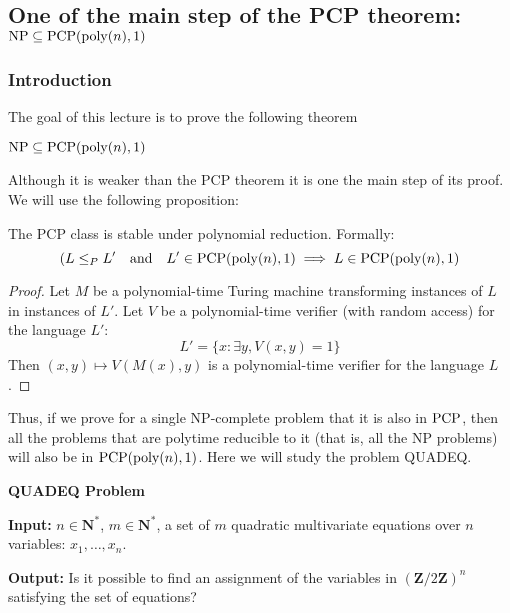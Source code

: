 


\subsection{One of the main step of the PCP theorem: $\mathrm{NP} \subseteq
\mathrm{PCP}(\mathrm{poly}(n),1)$}


\subsubsection{Introduction}
The goal of this lecture is to prove the following theorem
\begin{theorem}\label{theorem1}
$\mathrm{NP} \subseteq
\mathrm{PCP}(\mathrm{poly}(n),1)$
\end{theorem}

Although it is weaker than the PCP theorem it is one the main step of its proof.
We will use the following proposition:
\begin{prop}
The PCP class is stable under polynomial reduction. Formally:
\begin{displaymath}
(L\leq_P L' \quad\mathrm{and}\quad L'\in \mathrm{PCP}(\mathrm{poly}(n),1) \implies L\in
\mathrm{PCP}(\mathrm{poly}(n),1)
\end{displaymath}
\end{prop}

\begin{proof}
Let $M$ be a polynomial-time Turing machine transforming instances of $L$ in
instances of $L'$. Let $V$ be a polynomial-time verifier (with random access)
for the language $L'$:
\begin{displaymath}
L' = \{ x: \exists y, V(x,y) = 1 \}
\end{displaymath}
Then $(x,y)\mapsto V(M(x),y)$ is a polynomial-time verifier for the language
$L$. 
\end{proof}

Thus, if we prove for a single NP-complete problem that it is also in
$\mathrm{PCP}$, then all the problems that are polytime reducible to
it (that is, all the NP problems) will also be in $\mathrm{PCP}(\mathrm{poly}(n),1)$.
Here we will study the problem \textsf{QUADEQ}.

\begin{encadre}{\textwidth}
\begin{center}
\textbf{\textsf{QUADEQ} Problem}
\end{center}

\textbf{Input:} $n\in\mathbf{N}^*$, $m\in\mathbf{N}^*$, a set of $m$ quadratic
multivariate equations over $n$ variables: $x_1,\ldots,x_n$.

\textbf{Output:} Is it possible to find an assignment of the variables in
$(\mathbf{Z}/2\mathbf{Z})^n$ satisfying the set of equations?
\end{encadre}

